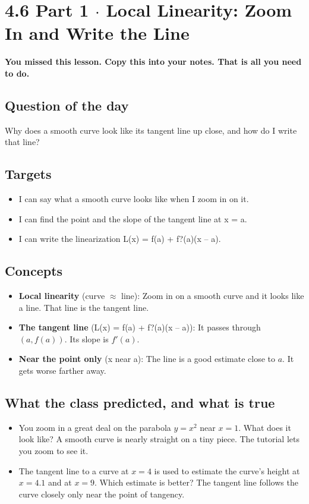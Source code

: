 \documentclass[11pt]{article}
\begin{document}
\section*{4.6 Part 1 $\cdot$ Local Linearity: Zoom In and Write the Line}
\textbf{You missed this lesson. Copy this into your notes. That is all you need to do.}\par\medskip
\subsection*{Question of the day}
Why does a smooth curve look like its tangent line up close, and how do I write that line?\par
\subsection*{Targets}\begin{itemize}\item I can say what a smooth curve looks like when I zoom in on it.
\item I can find the point and the slope of the tangent line at x = a.
\item I can write the linearization L(x) = f(a) + f?(a)(x -- a).\end{itemize}
\subsection*{Concepts}\begin{itemize}
\item \textbf{Local linearity} (curve $\approx$ line): Zoom in on a smooth curve and it looks like a line. That line is the tangent line.
\item \textbf{The tangent line} (L(x) = f(a) + f?(a)(x -- a)): It passes through $(a, f(a))$. Its slope is $f'(a)$.
\item \textbf{Near the point only} (x near a): The line is a good estimate close to $a$. It gets worse farther away.
\end{itemize}
\subsection*{What the class predicted, and what is true}\begin{itemize}
\item You zoom in a great deal on the parabola $y=x^2$ near $x=1$. What does it look like?  A smooth curve is nearly straight on a tiny piece. The tutorial lets you zoom to see it.
\item The tangent line to a curve at $x=4$ is used to estimate the curve's height at $x=4.1$ and at $x=9$. Which estimate is better?  The tangent line follows the curve closely only near the point of tangency.
\end{itemize}
\end{document}
